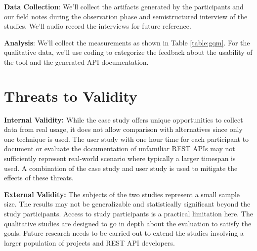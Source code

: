 \documentclass{article}
\begin{document}
\begin{itemize}
  \textbf{Data Collection}: We'll collect the artifacts generated by the participants and our field notes during the observation phase and semistructured interview of the studies. We'll audio record the interviews for future reference.

  \textbf{Analysis}: We'll collect the measurements as shown in Table \ref{table:gqm}. For the qualitative data, we'll use coding to categorize the feedback about the usability of the tool and the generated API documentation.
\end{itemize}

\section{Threats to Validity}

\textbf{Internal Validity:} While the case study offers unique opportunities to collect data from real usage, it does not allow comparison with alternatives since only one technique is used. The user study with one hour time for each participant to document or evaluate the documentation of unfamiliar REST APIs may not sufficiently represent real-world scenario where typically a larger timespan is used. A combination of the case study and user study is used to mitigate the effects of these threats.

\textbf{External Validity:} The subjects of the two studies represent a small sample size. The results may not be generalizable and statistically significant beyond the study participants. Access to study participants is a practical limitation here. The qualitative studies are designed to go in depth about the evaluation to satisfy the goals. Future research needs to be carried out to extend the studies involving a larger population of projects and REST API developers.
\end{document}
